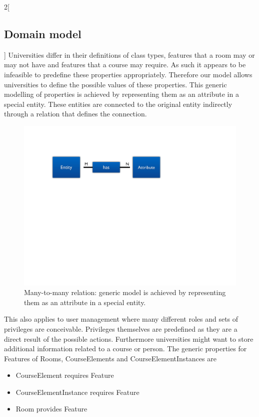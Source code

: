 \begin{multicols}{2}[\subsection{Domain model}]
Universities differ in their definitions of class types, features that a room may or may not have and features that a course may require. As such it appears to be infeasible to predefine these properties appropriately. Therefore our model allows universities to define the possible values of these properties. This generic modelling of properties is achieved by representing them as an attribute in a special entity. These entities are connected to the original entity indirectly through a relation that defines the connection.

\begin{figure}[H]
	\centering
		\includegraphics[width=\columnwidth]{images/orm_personroleprivilege.pdf}
	\caption{Many-to-many relation: generic model is achieved by representing them as an attribute in a
 special entity.}
	\label{fig:personroleprivilege}
\end{figure}

This also applies to user management where many different roles and sets of privileges are conceivable. Privileges themselves are predefined as they are a direct result of the possible actions. Furthermore universities might want to store additional information related to a course or person. The generic properties for Features of Rooms, CourseElements and CourseElementInstances are

\begin{itemize}
	\item CourseElement requires Feature
	\item CourseElementInstance requires Feature
	\item Room provides Feature
\end{itemize}


\end{multicols}
